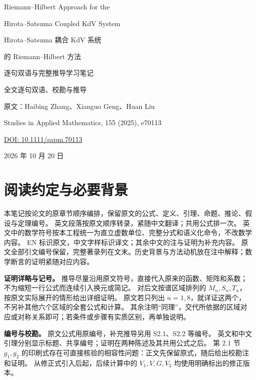 \begin{titlepage}
\centering
\vspace*{2cm}
{\Large Riemann--Hilbert Approach for the\par}
\medskip
{\Large Hirota--Satsuma Coupled KdV System\par}
\vspace{1cm}
{\huge Hirota--Satsuma 耦合 KdV 系统\par}
\medskip
{\huge 的 Riemann--Hilbert 方法\par}
\vspace{1cm}
{\LARGE 逐句双语与完整推导学习笔记\par}
\vspace{0.6cm}
{\Large 全文逐句双语、校勘与推导\par}
\vfill
{\large 原文：Haibing Zhang、Xianguo Geng、Huan Liu\par}
\medskip
Studies in Applied Mathematics, 155 (2025), e70113\par
\href{https://doi.org/10.1111/sapm.70113}{DOI: 10.1111/sapm.70113}\par
\vspace{1cm}
2026 年 10 月 20 日\par
\end{titlepage}

\chapter*{阅读约定与必要背景}
本笔记按论文的原章节顺序编排，保留原文的公式、定义、引理、命题、推论、假设与定理编号。
英文段落按原文顺序转录，紧随中文翻译；共用公式排一次。
英文中的数学符号按本工程统一为直立虚数单位、完整分式和语义化命令，不改数学内容。
EN 标识原文，中文字样标识译文；其余中文的注与证明为补充内容。
原文全部引文编号保留，完整著录列在文末。历史背景与方法动机放在注中解释；数学断言的证明紧随对应内容。

\begin{note}
  \textbf{证明详略与记号。}
  推导尽量沿用原文符号，直接代入原来的函数、矩阵和系数；不为缩短一行公式而连续引入换元或简记。
  对后文按谱区域排列的 $M_n,S_n,T_n$，按原文实际展开的情形给出详细证明。
  原文若只列出 $n=1,8$，就详证这两个，不另补其他六个区域的全套公式和计算。
  其余注明“同理”，交代所依据的区域对应或对称关系即可；若条件或步骤有实质区别，再单独说明。
\end{note}

\begin{note}
  \textbf{编号与校勘。}
  原文公式用原编号，补充推导另用 S2.1、S2.2 等编号。
  英文和中文引理分别显示标题、共享编号；证明在两种陈述及其共用公式之后。
  第 2.1 节 $g_1,g_2$ 的印刷式存在可直接核验的相容性问题：正文先保留原式，随后给出校勘注和证明。
  从修正式引入后起，后续计算中的 $V_1,V,G,V_2$ 均使用明确标出的修正版本。
\end{note}

